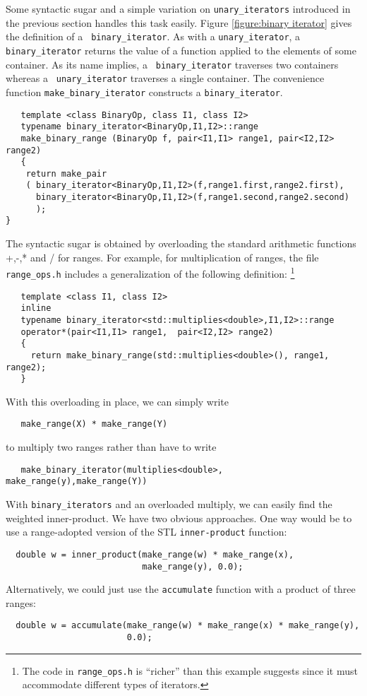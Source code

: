 \documentclass[12pt]{article}
\begin{document}
Some syntactic sugar and a simple variation on {\tt unary\_iterators}
introduced in the previous section handles this task easily.  Figure
\ref{figure:binary iterator} gives the definition of a {\tt
binary\_iterator}.  As with a {\tt unary\_iterator}, a {\tt
binary\_iterator} returns the value of a function applied to the
elements of some container.  As its name implies, a {\tt
binary\_iterator} traverses two containers whereas a {\tt
unary\_iterator} traverses a single container.  The convenience
function {\tt make\_binary\_iterator} constructs a {\tt binary\_iterator}.
\begin{verbatim}
   template <class BinaryOp, class I1, class I2>
   typename binary_iterator<BinaryOp,I1,I2>::range
   make_binary_range (BinaryOp f, pair<I1,I1> range1, pair<I2,I2> range2)
   {
    return make_pair
    ( binary_iterator<BinaryOp,I1,I2>(f,range1.first,range2.first),
      binary_iterator<BinaryOp,I1,I2>(f,range1.second,range2.second)
      );
}
\end{verbatim}
The syntactic sugar is obtained by overloading the standard arithmetic
functions +,-,* and / for ranges.  For example, for multiplication of
ranges, the file {\tt range\_ops.h} includes a generalization of the
following definition: \footnote{The code in {\tt range\_ops.h} is
``richer'' than this example suggests since it must accommodate
different types of iterators.}
\begin{verbatim}
   template <class I1, class I2>
   inline
   typename binary_iterator<std::multiplies<double>,I1,I2>::range
   operator*(pair<I1,I1> range1,  pair<I2,I2> range2)
   {
     return make_binary_range(std::multiplies<double>(), range1, range2);
   }
\end{verbatim}
With this overloading in place, we can simply write
\begin{verbatim}
   make_range(X) * make_range(Y)
\end{verbatim}
to multiply two ranges rather than have to write
\begin{verbatim}
   make_binary_iterator(multiplies<double>, make_range(y),make_range(Y))
\end{verbatim}


  With {\tt binary\_iterators} and an overloaded multiply, we can
easily find the weighted inner-product. We have two obvious
approaches. One way would be to use a range-adopted version of the STL
{\tt inner-product} function:
\begin{verbatim}
  double w = inner_product(make_range(w) * make_range(x), 
                           make_range(y), 0.0);
\end{verbatim}
Alternatively, we could just use the {\tt accumulate} function with a
product of three ranges:
\begin{verbatim}
  double w = accumulate(make_range(w) * make_range(x) * make_range(y),
                        0.0);
\end{verbatim}
\end{document}
